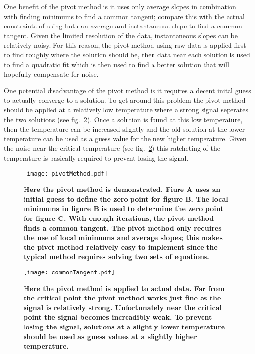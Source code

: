 One benefit of the pivot method is it uses only average slopes in combination with finding minimums to find a common tangent; compare this with the actual constraints of using both an average and instantaneous slope to find a common tangent. Given the limited resolution of the data, instantaneous slopes can be relatively noisy. For this reason, the pivot method using raw data is applied first to find roughly where the solution should be, then data near each solution is used to find a quadratic fit which is then used to find a better solution that will hopefully compensate for noise.

One potential disadvantage of the pivot method is it requires a decent inital guess to actually converge to a solution. To get around this problem the pivot method should be applied at a relatively low temperature where a strong signal seperates the two solutions (see fig.~\ref{fig:FdispVsff}). Once a solution is found at this low temperature, then the temperature can be increased slightly and the old solution at the lower temperature can be used as a guess value for the new higher temperature. Given the noise near the critical temperature (see fig.~\ref{fig:FdispVsff}) this ratcheting of the temperature is basically required to prevent losing the signal.

\begin{figure}[h!]
\hspace*{-6mm}
	\centering
	\texttt{[image: pivotMethod.pdf]}
	\caption{\label{fig:pivotMethod}
	\scriptsize \textbf{Here the pivot method is demonstrated. Fiure A uses an initial guess to define the zero point for figure B. The local minimums in figure B is used to determine the zero point for figure C. With enough iterations, the pivot method finds a common tangent. The pivot method only requires the use of local minimums and average slopes; this makes the pivot method relatively easy to implement since the typical method requires solving two sets of equations.}}
	
\end{figure}
\begin{figure}[!h]

\hspace*{-6mm}
	\centering
	\texttt{[image: commonTangent.pdf]}
	\caption{\scriptsize \textbf{Here the pivot method is applied to actual data. Far from the critical point the pivot method works just fine as the signal is relatively strong. Unfortunately near the critical point the signal becomes increadibly weak. To prevent losing the signal, solutions at a slightly lower temperature should be used as guess values at a slightly higher temperature.}}
	\label{fig:FdispVsff}
\end{figure}




